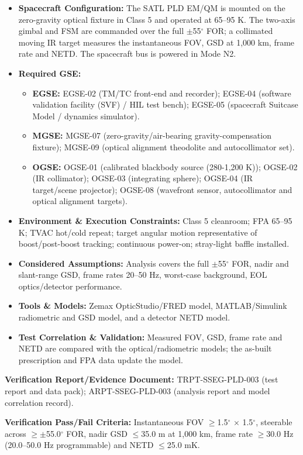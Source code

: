 \begin{itemize}
\item \textbf{Spacecraft Configuration:} The SATL PLD EM/QM is mounted on the zero-gravity optical fixture in Class 5 and operated at 65--95 K. The two-axis gimbal and FSM are commanded over the full $\pm$55$^\circ$ FOR; a collimated moving IR target measures the instantaneous FOV, GSD at 1,000 km, frame rate and NETD. The spacecraft bus is powered in Mode N2.
\item \textbf{Required GSE:}
\begin{itemize}
\item \textbf{EGSE:} EGSE-02 (TM/TC front-end and recorder); EGSE-04 (software validation facility (SVF) / HIL test bench); EGSE-05 (spacecraft Suitcase Model / dynamics simulator).
\item \textbf{MGSE:} MGSE-07 (zero-gravity/air-bearing gravity-compensation fixture); MGSE-09 (optical alignment theodolite and autocollimator set).
\item \textbf{OGSE:} OGSE-01 (calibrated blackbody source (280-1,200 K)); OGSE-02 (IR collimator); OGSE-03 (integrating sphere); OGSE-04 (IR target/scene projector); OGSE-08 (wavefront sensor, autocollimator and optical alignment targets).
\end{itemize}
\item \textbf{Environment \& Execution Constraints:} Class 5 cleanroom; FPA 65--95 K; TVAC hot/cold repeat; target angular motion representative of boost/post-boost tracking; continuous power-on; stray-light baffle installed.
\item \textbf{Considered Assumptions:} Analysis covers the full $\pm$55$^\circ$ FOR, nadir and slant-range GSD, frame rates 20--50 Hz, worst-case background, EOL optics/detector performance.
\item \textbf{Tools \& Models:} Zemax OpticStudio/FRED model, MATLAB/Simulink radiometric and GSD model, and a detector NETD model.
\item \textbf{Test Correlation \& Validation:} Measured FOV, GSD, frame rate and NETD are compared with the optical/radiometric models; the as-built prescription and FPA data update the model.
\end{itemize}
\par\textbf{Verification Report/Evidence Document:} TRPT-SSEG-PLD-003 (test report and data pack); ARPT-SSEG-PLD-003 (analysis report and model correlation record).
\par\textbf{Verification Pass/Fail Criteria:} Instantaneous FOV $\ge$1.5$^\circ$ $\times$ 1.5$^\circ$, steerable across $\ge$$\pm$55.0$^\circ$ FOR, nadir GSD $\le$35.0 m at 1,000 km, frame rate $\ge$30.0 Hz (20.0--50.0 Hz programmable) and NETD $\le$25.0 mK.
\par\medskip
